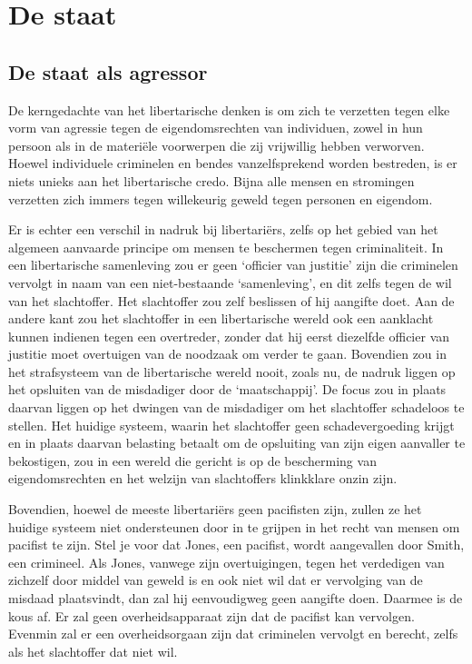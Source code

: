 \documentclass[
  a5paper,
  smalldemyvopaper,10pt,twoside,onecolumn,openright,extrafontsizes,hidelinks]{memoir}
\begin{document}

\chapter{De staat}\label{de-staat}

\section{De staat als agressor}\label{de-staat-als-agressor}

De kerngedachte van het libertarische denken is om zich te verzetten
tegen elke vorm van agressie tegen de eigendomsrechten van individuen,
zowel in hun persoon als in de materiële voorwerpen die zij vrijwillig
hebben verworven. Hoewel individuele criminelen en bendes
vanzelfsprekend worden bestreden, is er niets unieks aan het
libertarische credo. Bijna alle mensen en stromingen verzetten zich
immers tegen willekeurig geweld tegen personen en eigendom.

Er is echter een verschil in nadruk bij libertariërs, zelfs op het
gebied van het algemeen aanvaarde principe om mensen te beschermen tegen
criminaliteit. In een libertarische samenleving zou er geen `officier
van justitie' zijn die criminelen vervolgt in naam van een
niet-bestaande `samenleving', en dit zelfs tegen de wil van het
slachtoffer. Het slachtoffer zou zelf beslissen of hij aangifte doet.
Aan de andere kant zou het slachtoffer in een libertarische wereld ook
een aanklacht kunnen indienen tegen een overtreder, zonder dat hij eerst
diezelfde officier van justitie moet overtuigen van de noodzaak om
verder te gaan. Bovendien zou in het strafsysteem van de libertarische
wereld nooit, zoals nu, de nadruk liggen op het opsluiten van de
misdadiger door de `maatschappij'. De focus zou in plaats daarvan liggen
op het dwingen van de misdadiger om het slachtoffer schadeloos te
stellen. Het huidige systeem, waarin het slachtoffer geen
schadevergoeding krijgt en in plaats daarvan belasting betaalt om de
opsluiting van zijn eigen aanvaller te bekostigen, zou in een wereld die
gericht is op de bescherming van eigendomsrechten en het welzijn van
slachtoffers klinkklare onzin zijn.

Bovendien, hoewel de meeste libertariërs geen pacifisten zijn, zullen ze
het huidige systeem niet ondersteunen door in te grijpen in het recht
van mensen om pacifist te zijn. Stel je voor dat Jones, een pacifist,
wordt aangevallen door Smith, een crimineel. Als Jones, vanwege zijn
overtuigingen, tegen het verdedigen van zichzelf door middel van geweld
is en ook niet wil dat er vervolging van de misdaad plaatsvindt, dan zal
hij eenvoudigweg geen aangifte doen. Daarmee is de kous af. Er zal geen
overheidsapparaat zijn dat de pacifist kan vervolgen. Evenmin zal er een
overheidsorgaan zijn dat criminelen vervolgt en berecht, zelfs als het
slachtoffer dat niet wil.
\end{document}
